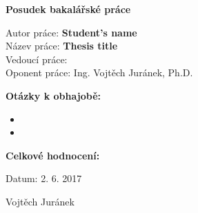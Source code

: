 \documentclass[a4paper,10pt]{report}
\begin{document}
\begin{center}
{\Large \bfseries Posudek bakalářské práce}\\
\end{center}

\vspace{0.5cm}

\begin{flushleft}
Autor práce: \textbf{Student's name} \\
Název práce: \textbf{Thesis title} \\
Vedoucí práce:  \\
Oponent práce: Ing. Vojtěch Juránek, Ph.D.\\
\end{flushleft}
\vspace{0.5cm}

\par

\par

\par

\par

\par


\vspace{0.25cm}
\begin{flushleft}
\textbf{Otázky k obhajobě:}
\end{flushleft}
\begin{itemize}
 \item 
 \item 
\end{itemize}

\vspace{0.25cm}
\begin{flushleft}
\textbf{Celkové hodnocení:}\\
\end{flushleft}


\vspace{0.5cm}

\begin{flushleft}
Datum: 2. 6. 2017
\end{flushleft}

\begin{flushright}
Vojtěch Juránek
\end{flushright}
\end{document}
